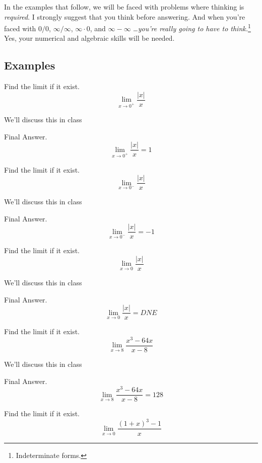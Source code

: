 \documentclass[12pt,addpoints, answers, fleqn]{exam}
\begin{document}
In the examples that follow, we will be faced with problems where thinking is \emph{required}. I strongly suggest that you think before answering. And when you're faced with $0/0$, $\infty/\infty$, $\infty \cdot 0$, and $\infty - \infty$ \dots \emph{you're really going to have to think.}\footnote{Indeterminate forms.} Yes, your numerical and algebraic skills will be needed.

\subsection{Examples}

\begin{questions}
\question Find the limit if it exist.
\[
\mathop {\lim }\limits_{x \to 0^+}  \frac{\left| x \right|}{x}
\]

\begin{solution}
We'll discuss this in class

Final Answer.
\[
\mathop {\lim }\limits_{x \to 0^+}  \frac{\left| x \right|}{x} =1
\]
\end{solution}


\question Find the limit if it exist.
\[
\mathop {\lim }\limits_{x \to 0^-}  \frac{\left| x \right|}{x}
\]

\begin{solution}
We'll discuss this in class

Final Answer.
\[
\mathop {\lim }\limits_{x \to 0^-}  \frac{\left| x \right|}{x} = -1
\]
\end{solution}

\question Find the limit if it exist.
\[
\mathop {\lim }\limits_{x \to 0}  \frac{\left| x \right|}{x}
\]

\begin{solution}
We'll discuss this in class

Final Answer.
\[
\mathop {\lim }\limits_{x \to 0}  \frac{\left| x \right|}{x} = DNE
\]
\end{solution}


\question Find the limit if it exist.
\[
\lim_{x \to 8} \frac{x^3-64x}{x-8}
\]

\begin{solution}
We'll discuss this in class

Final Answer.
\[
\lim_{x \to 8} \frac{x^3-64x}{x-8} = 128
\]
\end{solution}

\question Find the limit if it exist.
\[
\lim_{x \to 0} \frac{\left(1+x\right)^3-1}{x}
\]


\end{questions}
\end{document}

